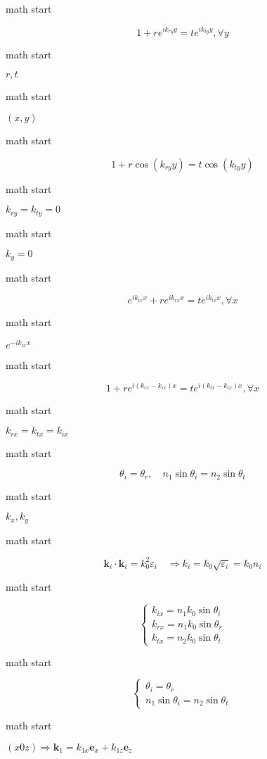 math start

\[1 + r e^{i{k_{ry}y}} = t e^{i{k_{ty}y}}, \forall y\]

math start

\(r,t\)

math start

\((x,y)\)

math start

\[1 + r \cos(k_{ry}y) = t \cos({k_{ty}y})\]

math start

\(k_{ry}=k_{ty}=0\)

math start

\(k_y=0\)

math start

\[e^{i {k_{ix}x}} + r e^{i{k_{rx}x}} = t e^{i{k_{tx}x}}, \forall x\]

math start

\(e^{-i {k_{ix}x}}\)

math start

\[1 + r e^{i{(k_{rx}-k_{ix})x}} = t e^{i{(k_{tx}-k_{ix})x}}, \forall x\]

math start

\(k_{rx}=k_{tx}=k_{ix}\)

math start

\[\theta_i = \theta_r,\quad n_1\sin \theta_i=n_2\sin \theta_t\]

math start

\(k_{x}, k_{y}\)

math start

\[\mathbf{k}_{i} \cdot \mathbf{k}_{i}=k_{0}^{2} \varepsilon_{i} \quad \Rightarrow k_{i}=k_{0} \sqrt{\varepsilon_{i}}=k_{0} n_{i}\]

math start

\[\left\{\begin{array}{l}k_{i x}=n_{1} k_{0} \sin \theta_{i} \\ k_{r x}=n_{1} k_{0} \sin \theta_{r} \\ k_{t x}=n_{2} k_{0} \sin \theta_{t}\end{array}\right.\]

math start

\[\left\{\begin{array}{c}\theta_{i}=\theta_{r} \\ n_{1} \sin \theta_{i}=n_{2} \sin \theta_{t}\end{array}\right.\]

math start

\((x 0 z) \Rightarrow \mathbf{k}_{1}=k_{1 x} \mathbf{e}_{x}+k_{1 z} \mathbf{e}_{z}\)

